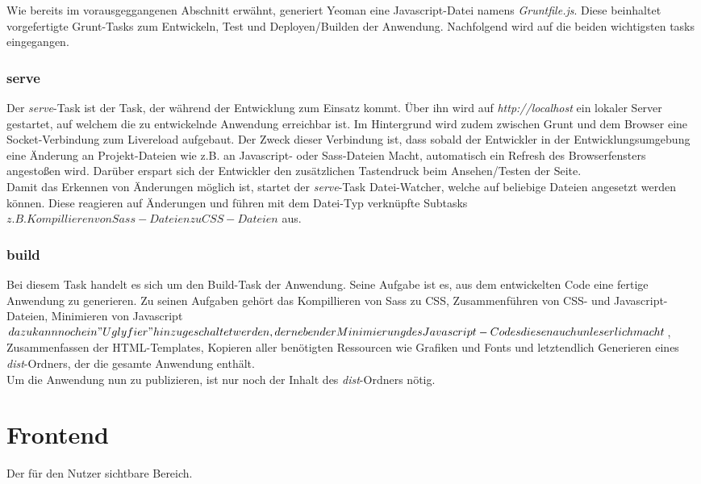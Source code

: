 Wie bereits im vorausgeggangenen Abschnitt erwähnt, generiert Yeoman eine Javascript-Datei namens \textit{Gruntfile.js}. Diese beinhaltet vorgefertigte Grunt-Tasks zum Entwickeln, Test und
Deployen/Builden der Anwendung. Nachfolgend wird auf die beiden wichtigsten tasks eingegangen.

\subsubsection{serve}
Der \textit{serve}-Task ist der Task, der während der Entwicklung zum Einsatz kommt. Über ihn wird auf \textit{http://localhost} ein lokaler Server gestartet, auf welchem
die zu entwickelnde Anwendung erreichbar ist. Im Hintergrund wird zudem zwischen Grunt und dem Browser eine Socket-Verbindung zum Livereload aufgebaut. Der Zweck dieser Verbindung ist,
dass sobald der Entwickler in der Entwicklungsumgebung eine Änderung an Projekt-Dateien wie z.B. an Javascript- oder Sass-Dateien Macht, automatisch ein Refresh des Browserfensters angestoßen wird.
Darüber erspart sich der Entwickler den zusätzlichen Tastendruck beim Ansehen/Testen der Seite.\\
Damit das Erkennen von Änderungen möglich ist, startet der \textit{serve}-Task Datei-Watcher, welche auf beliebige Dateien angesetzt werden können. Diese reagieren auf Änderungen und führen
mit dem Datei-Typ verknüpfte Subtasks \(z.B. Kompillieren von Sass-Dateien zu CSS-Dateien\) aus.

\subsubsection{build}
Bei diesem Task handelt es sich um den Build-Task der Anwendung. Seine Aufgabe ist es, aus dem entwickelten Code eine fertige Anwendung zu generieren.
Zu seinen Aufgaben gehört das Kompillieren von Sass zu CSS, Zusammenführen von CSS- und Javascript-Dateien, Minimieren von Javascript \(dazu kann noch ein "Uglyfier" hinzugeschaltet werden, der neben
der Minimierung des Javascript-Codes diesen auch unleserlich macht\), Zusammenfassen der HTML-Templates, Kopieren aller benötigten Ressourcen wie Grafiken und Fonts und letztendlich Generieren
eines \textit{dist}-Ordners, der die gesamte Anwendung enthält.\\
Um die Anwendung nun zu publizieren, ist nur noch der Inhalt des \textit{dist}-Ordners nötig.

\section{Frontend}
Der für den Nutzer sichtbare Bereich.
